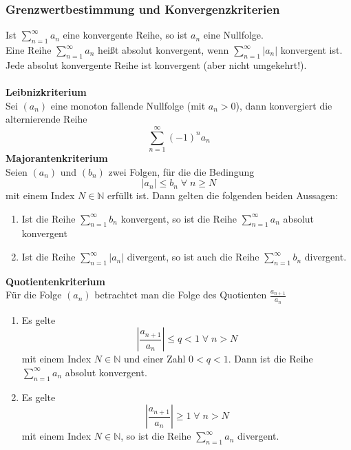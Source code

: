 \documentclass[a4paper,twocolumn,10pt]{article}
\begin{document}
\subsubsection{Grenzwertbestimmung und Konvergenzkriterien}
Ist $\sum\limits_{n=1}^{\infty}a_n$ eine konvergente Reihe, so ist $a_n$ eine Nullfolge.\\
Eine Reihe $\sum\limits_{n=1}^{\infty}a_n$ heißt absolut konvergent, wenn $\sum\limits_{n=1}^{\infty}|a_n|$ konvergent ist.\\
Jede absolut konvergente Reihe ist konvergent (aber nicht umgekehrt!).\\\\
\textbf{Leibnizkriterium}\\
Sei $(a_n)$ eine monoton fallende Nullfolge (mit $a_n>0$), dann konvergiert die alternierende Reihe
\begin{equation*}
\sum\limits_{n=1}^{\infty}(-1)^na_n
\end{equation*}
\textbf{Majorantenkriterium}\\
Seien $(a_n)$ und $(b_n)$ zwei Folgen, für die die Bedingung
\begin{equation*}
|a_n|\leq b_n\;\forall\; n\geq N
\end{equation*}
mit einem Index $N\in\mathbb{N}$ erfüllt ist. Dann gelten die folgenden beiden Aussagen:
\begin{enumerate}
\item Ist die Reihe $\sum\limits_{n=1}^{\infty}b_n$ konvergent, so ist die Reihe $\sum\limits_{n=1}^{\infty}a_n$ absolut konvergent
\item Ist die Reihe $\sum\limits_{n=1}^{\infty}|a_n|$ divergent, so ist auch die Reihe $\sum\limits_{n=1}^{\infty}b_n$ divergent.
\end{enumerate}
\textbf{Quotientenkriterium}\\
Für die Folge $(a_n)$ betrachtet man die Folge des Quotienten $\frac{a_{n+1}}{a_n}$
\begin{enumerate}
\item Es gelte
\begin{equation*}
\left|\frac{a_{n+1}}{a_n}\right|\leq q<1\;\forall\;n>N
\end{equation*}
mit einem Index $N\in\mathbb{N}$ und einer Zahl $0<q<1$. Dann ist die Reihe $\sum\limits_{n=1}^{\infty}a_n$ absolut konvergent.
\item Es gelte
\begin{equation*}
\left|\frac{a_{n+1}}{a_n}\right|\geq 1\;\forall\;n>N
\end{equation*}
mit einem Index $N\in\mathbb{N}$, so ist die Reihe $\sum\limits_{n=1}^{\infty}a_n$ divergent.
\end{enumerate}
\end{document}
